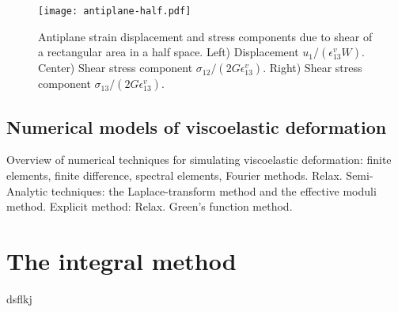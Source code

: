 \documentclass[letterpaper,12pt,]{memoir}
\begin{document}
\begin{sidewaysfigure}[p]
\texttt{[image: antiplane-half.pdf]}
\caption{Antiplane strain displacement and stress components due to shear of a rectangular area in a half space. Left) Displacement $u_1/(\epsilon_{13}^vW)$. Center) Shear stress component $\sigma_{12}/(2G\epsilon_{13}^v)$. Right) Shear stress component $\sigma_{13}/(2G\epsilon_{13}^v)$.}
\end{sidewaysfigure}


\clearpage
\section{Numerical models of viscoelastic deformation}

Overview of numerical techniques for simulating viscoelastic deformation: finite elements, finite difference, spectral elements, Fourier methods. Relax. Semi-Analytic techniques: the Laplace-transform method and the effective moduli method. Explicit method: Relax. Green's function method.

\clearpage

\chapter{The integral method}

dsflkj

\footnotesize{
\printindex
}

\clearpage


\small

\end{document}
